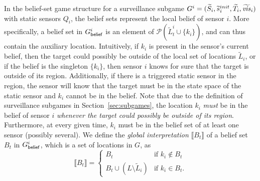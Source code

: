In the belief-set game structure for a surveillance subgame $G^{i} = (\widetilde{S}_i,\widetilde{s}_i^{init},\widetilde{T}_i,\widetilde{\mathit{vis}}_i)$ with static sensors $Q_i$, the belief sets represent the local belief of sensor $i$. More specifically, a belief set in $G^{i}_{\mathsf{belief}}$ is an element of  $\mathcal{P}(\widetilde{L}^i_t \cup \{k_i\})$, and can thus contain the auxiliary location. Intuitively, if $ k_i$ is present in the sensor's current belief, then the target could possibly be outside of the local set of locations $\widetilde L_i$, or if the belief is the singleton $\{k_i\}$, then sensor $i$ knows for sure that the target is outside of its region. Additionally, if there is a triggered static sensor in the region, the sensor will know that the target must be in the state space of the static sensor and $k_i$ cannot be in the belief. Note that due to the definition of surveillance subgames in Section~\ref{sec:subgames}, the location $k_i$ \emph{must} be in the belief of sensor $i$ \emph{whenever the target could possibly be outside of its region}. Furthermore, at every given time, $k_i$ must be in the belief set of at least one sensor (possibly several).  
We define the \emph{global interpretation} $\llbracket B_t\rrbracket$ of a belief set $B_t$ in $G^{i}_{\mathsf{belief}}$, which is a set of locations in $G$, as
 \[\llbracket B_t\rrbracket = \begin{cases}
B_t & \text{if } k_i \not\in B_t\\
B_t \cup (L \setminus \widetilde L_i) & \text{if } k_i  \in B_t.
\end{cases}
\]

